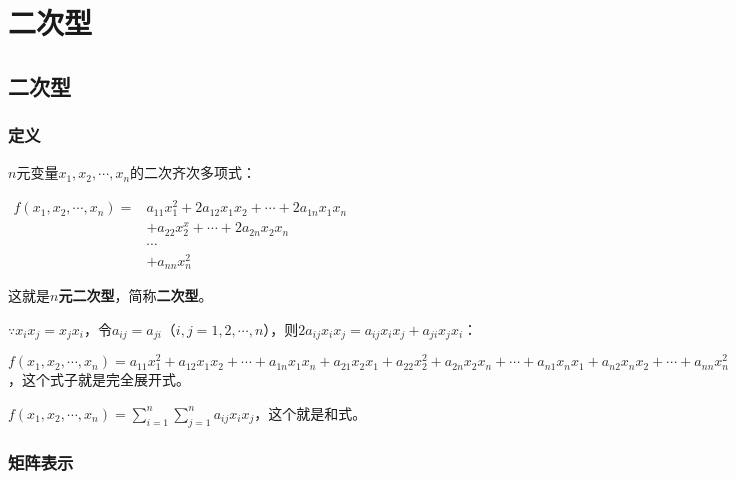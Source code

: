\setcounter{tocdepth}{4}
\setcounter{secnumdepth}{4}
\renewcommand{\baselinestretch}{1.5}
\chapter{二次型}
\section{二次型}

\subsection{定义}

$n$元变量$x_1,x_2,\cdots,x_n$的二次齐次多项式：

$
\begin{array}{cr}
    f(x_1,x_2,\cdots,x_n)= & a_{11}x_1^2+2a_{12}x_1x_2+\cdots+2a_{1n}x_1x_n \\
    & +a_{22}x_2^x+\cdots+2a_{2n}x_2x_n \\
    & \cdots \\
    & +a_{nn}x_n^2
\end{array}
$

这就是\textbf{$n$元二次型}，简称\textbf{二次型}。

$\because x_ix_j=x_jx_i$，令$a_{ij}=a_{ji}$（$i,j=1,2,\cdots,n$），则$2a_{ij}x_ix_j=a_{ij}x_ix_j+a_{ji}x_jx_i$：

$f(x_1,x_2,\cdots,x_n)=a_{11}x_1^2+a_{12}x_1x_2+\cdots+a_{1n}x_1x_n+a_{21}x_2x_1+a_{22}x_2^2+a_{2n}x_2x_n+\cdots+a_{n1}x_nx_1+a_{n2}x_nx_2+\cdots+a_{nn}x_n^2$，这个式子就是完全展开式。

$f(x_1,x_2,\cdots,x_n)=\sum\limits_{i=1}^n\sum\limits_{j=1}^na_{ij}x_ix_j$，这个就是和式。

\subsection{矩阵表示}

